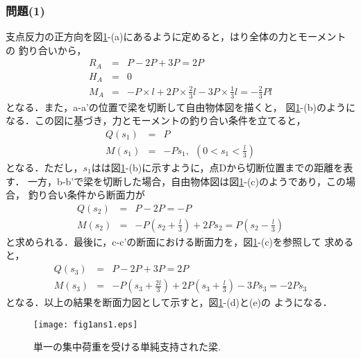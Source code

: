 \documentclass[10pt,a4j]{jarticle}
\begin{document}
\subsubsection*{問題(1)}
支点反力の正方向を図\ref{fig:fig1_1}-(a)にあるように定めると，はり全体の力とモーメントの
釣り合いから，
\begin{eqnarray}
	R_A &=& P-2P+3P=2P \\
	H_A &=&0 \\
	M_A &=& -P\times l + 2P\times \frac{2}{3}l -3P\times \frac{1}{3}l=-\frac{2}{3}Pl
	\label{eqn:Rs_simple}
\end{eqnarray}
となる．また，a-a'の位置で梁を切断して自由物体図を描くと，
図\ref{fig:fig1_1}-(b)のようになる．この図に基づき，力とモーメントの釣り合い条件を立てると，
\begin{eqnarray}
	Q(s_1) &=& P \\
	M(s_1) &=& -Ps_1, \ \ \left(0<s_1 < \frac{l}{3}\right)
	\label{eqn:eqlbl}
\end{eqnarray}
となる．ただし，$s_1$はは図\ref{fig:fig1_1}-(b)に示すように，点Dから切断位置までの距離を表す．
一方，b-b'で梁を切断した場合，自由物体図は図\ref{fig:fig1_1}-(c)のようであり，この場合，
釣り合い条件から断面力が
\begin{eqnarray}
	Q(s_2) &=& P-2P=-P \\ 
	M(s_2) &=& -P\left(s_2+\frac{l}{3}\right) +2Ps_2 = P \left( s_2-\frac{l}{3}\right)
	\label{eqn:eqlbl}
\end{eqnarray}
と求められる．最後に，c-c'の断面における断面力を，図\ref{fig:fig1_1}-(c)を参照して
求めると，
\begin{eqnarray}
	Q(s_3) &=&P-2P+3P=2P \\ 
	M(s_3) &=&-P\left(s_3+\frac{2l}{3}\right) +2P\left(s_3+\frac{l}{3}\right) -3P s_3
	=-2Ps_3 
	\label{eqn:eqlbl}
\end{eqnarray}
となる．以上の結果を断面力図として示すと，図\ref{fig:fig1_1}-(d)と(e)の
ようになる．
\begin{figure}[h]
	\begin{center}
	\texttt{[image: fig1ans1.eps]} 
	\end{center}
	\caption{単一の集中荷重を受ける単純支持された梁.} 
	\label{fig:fig1_1}
\end{figure}
\end{document}
